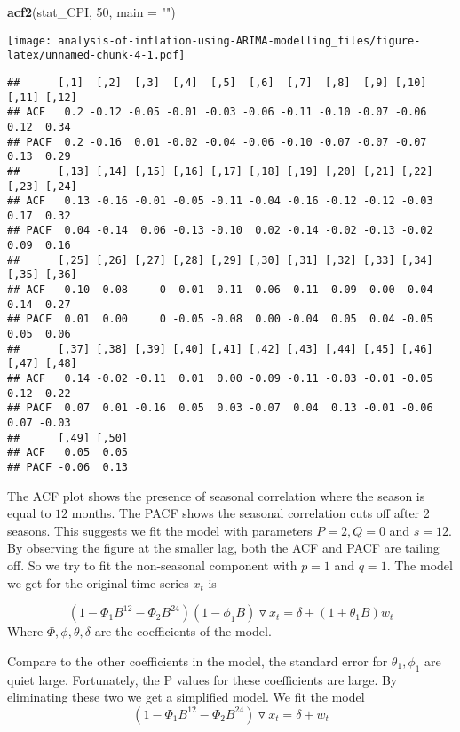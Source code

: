 \documentclass[
  12pt,
]{article}
\newenvironment{Shaded}{\begin{snugshade}}{\end{snugshade}}
\newcommand{\AttributeTok}[1]{\textcolor[rgb]{0.13,0.29,0.53}{#1}}
\newcommand{\DecValTok}[1]{\textcolor[rgb]{0.00,0.00,0.81}{#1}}
\newcommand{\FunctionTok}[1]{\textcolor[rgb]{0.13,0.29,0.53}{\textbf{#1}}}
\newcommand{\NormalTok}[1]{#1}
\newcommand{\StringTok}[1]{\textcolor[rgb]{0.31,0.60,0.02}{#1}}
\begin{document}
\begin{Shaded}
\begin{Highlighting}[]
\FunctionTok{acf2}\NormalTok{(stat\_CPI, }\DecValTok{50}\NormalTok{, }\AttributeTok{main =} \StringTok{""}\NormalTok{)}
\end{Highlighting}
\end{Shaded}

\texttt{[image: analysis-of-inflation-using-ARIMA-modelling\_files/figure-latex/unnamed-chunk-4-1.pdf]}

\begin{verbatim}
##      [,1]  [,2]  [,3]  [,4]  [,5]  [,6]  [,7]  [,8]  [,9] [,10] [,11] [,12]
## ACF   0.2 -0.12 -0.05 -0.01 -0.03 -0.06 -0.11 -0.10 -0.07 -0.06  0.12  0.34
## PACF  0.2 -0.16  0.01 -0.02 -0.04 -0.06 -0.10 -0.07 -0.07 -0.07  0.13  0.29
##      [,13] [,14] [,15] [,16] [,17] [,18] [,19] [,20] [,21] [,22] [,23] [,24]
## ACF   0.13 -0.16 -0.01 -0.05 -0.11 -0.04 -0.16 -0.12 -0.12 -0.03  0.17  0.32
## PACF  0.04 -0.14  0.06 -0.13 -0.10  0.02 -0.14 -0.02 -0.13 -0.02  0.09  0.16
##      [,25] [,26] [,27] [,28] [,29] [,30] [,31] [,32] [,33] [,34] [,35] [,36]
## ACF   0.10 -0.08     0  0.01 -0.11 -0.06 -0.11 -0.09  0.00 -0.04  0.14  0.27
## PACF  0.01  0.00     0 -0.05 -0.08  0.00 -0.04  0.05  0.04 -0.05  0.05  0.06
##      [,37] [,38] [,39] [,40] [,41] [,42] [,43] [,44] [,45] [,46] [,47] [,48]
## ACF   0.14 -0.02 -0.11  0.01  0.00 -0.09 -0.11 -0.03 -0.01 -0.05  0.12  0.22
## PACF  0.07  0.01 -0.16  0.05  0.03 -0.07  0.04  0.13 -0.01 -0.06  0.07 -0.03
##      [,49] [,50]
## ACF   0.05  0.05
## PACF -0.06  0.13
\end{verbatim}

The ACF plot shows the presence of seasonal correlation where the season
is equal to \(12\) months. The PACF shows the seasonal correlation cuts
off after 2 seasons. This suggests we fit the model with parameters
\(P = 2, Q = 0\) and \(s = 12\). By observing the figure at the smaller
lag, both the ACF and PACF are tailing off. So we try to fit the
non-seasonal component with \(p = 1\) and \(q = 1\). The model we get
for the original time series \(x_t\) is

\begin{equation}
    \label{SARIMA model}
    ( 1 - \Phi_1 B^{12} - \Phi_2  B^{24} )( 1 - \phi_1 B) \triangledown x_t = \delta + ( 1 + \theta_1 B) w_t
\end{equation} Where \(\Phi, \phi, \theta, \delta\) are the coefficients
of the model.

Compare to the other coefficients in the model, the standard error for
\(\theta_1, \phi_1\) are quiet large. Fortunately, the P values for
these coefficients are large. By eliminating these two we get a
simplified model. We fit the model \begin{equation}
    \label{SARIMA2}
    ( 1 - \Phi_1 B^{12} - \Phi_2  B^{24} ) \triangledown x_t = \delta + w_t
\end{equation}
\end{document}

